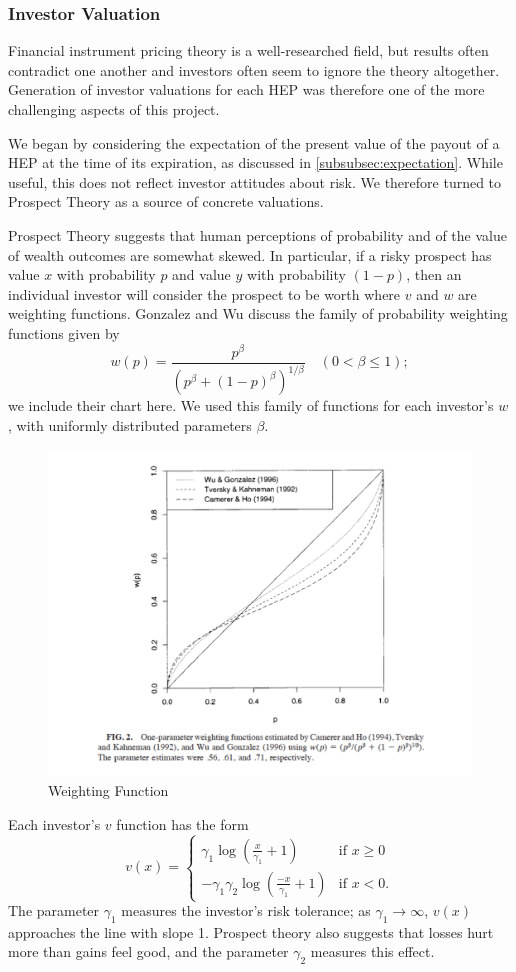 \documentclass[twoside]{article}
\begin{document}

\subsubsection{Investor Valuation}
Financial instrument pricing theory is a well-researched field, but results often contradict one another and investors often seem to ignore the theory altogether. Generation of investor valuations for each HEP was therefore one of the more challenging aspects of this project.

We began by considering the expectation of the present value of the payout of a HEP at the time of its expiration, as discussed in \ref{subsubsec:expectation}. While useful, this does not reflect investor attitudes about risk. We therefore turned to Prospect Theory as a source of concrete valuations.

Prospect Theory suggests that human perceptions of probability and of the value of wealth outcomes are somewhat skewed. In particular, if a risky prospect has value $x$ with probability $p$ and value $y$ with probability $(1-p)$, then an individual investor will consider the prospect to be worth
where $v$ and $w$ are weighting functions. Gonzalez and Wu discuss the family of probability weighting functions given by
$$
w(p) = \frac{p^\beta}{\left(p^\beta+(1-p)^\beta\right)^{1/\beta}}\quad(0<\beta\leq1);
$$
we include their chart here. We used this family of functions for each investor's $w$, with uniformly distributed parameters $\beta$.

\begin{figure}
\centering
\includegraphics[width=.65\linewidth]{WeightingFunction.pdf}
\caption{Weighting Function}
\end{figure}

Each investor's $v$ function has the form 
$$v(x)=\begin{cases}
\gamma_1\log(\frac{x}{\gamma_1}+1)&\text{if }x\geq 0\\
-\gamma_1\gamma_2\log(\frac{-x}{\gamma_1}+1)&\text{if }x< 0.
\end{cases}
$$
The parameter $\gamma_1$  measures the investor's risk tolerance; as $\gamma_1\to\infty$, $v(x)$ approaches the line with slope 1. Prospect theory also suggests that losses hurt more than gains feel good, and the parameter $\gamma_2$ measures this effect.\
\end{document}
